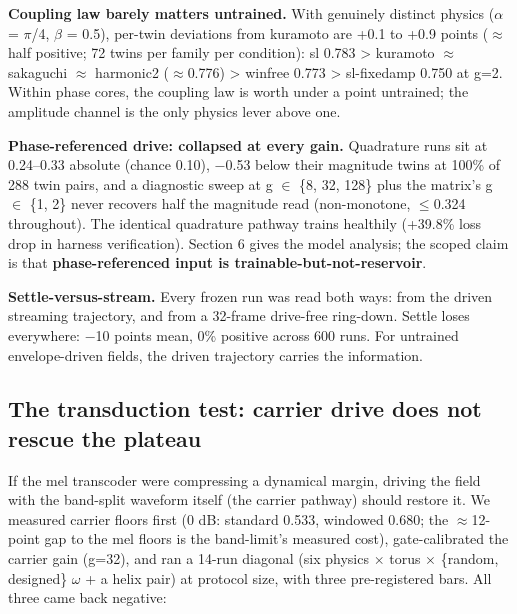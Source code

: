 \documentclass[10pt]{article}
\begin{document}
\textbf{Coupling law barely matters untrained.} With genuinely distinct
physics (\ensuremath{\alpha} = \ensuremath{\pi}/4, \ensuremath{\beta} =
0.5), per-twin deviations from kuramoto are +0.1 to +0.9 points
(\ensuremath{\approx} half positive; 72 twins per family per condition):
sl 0.783 \textgreater{} kuramoto \ensuremath{\approx} sakaguchi
\ensuremath{\approx} harmonic2 (\ensuremath{\approx}0.776)
\textgreater{} winfree 0.773 \textgreater{} sl-fixedamp 0.750 at g=2.
Within phase cores, the coupling law is worth under a point untrained;
the amplitude channel is the only physics lever above one.

\textbf{Phase-referenced drive: collapsed at every gain.} Quadrature
runs sit at 0.24--0.33 absolute (chance 0.10), \ensuremath{-}0.53 below
their magnitude twins at 100\% of 288 twin pairs, and a diagnostic sweep
at g \ensuremath{\in} \{8, 32, 128\} plus the matrix's g
\ensuremath{\in} \{1, 2\} never recovers half the magnitude read
(non-monotone, \ensuremath{\leq}0.324 throughout). The identical
quadrature pathway trains healthily (+39.8\% loss drop in harness
verification). Section 6 gives the model analysis; the scoped claim is
that \textbf{phase-referenced input is trainable-but-not-reservoir}.

\textbf{Settle-versus-stream.} Every frozen run was read both ways: from
the driven streaming trajectory, and from a 32-frame drive-free
ring-down. Settle loses everywhere: \ensuremath{-}10 points mean, 0\%
positive across 600 runs. For untrained envelope-driven fields, the
driven trajectory carries the information.

\subsection{The transduction test: carrier drive does not rescue the
plateau}\label{the-transduction-test-carrier-drive-does-not-rescue-the-plateau}

If the mel transcoder were compressing a dynamical margin, driving the
field with the band-split waveform itself (the carrier pathway) should
restore it. We measured carrier floors first (0 dB: standard 0.533,
windowed 0.680; the \ensuremath{\approx}12-point gap to the mel floors
is the band-limit's measured cost), gate-calibrated the carrier gain
(g=32), and ran a 14-run diagonal (six physics \ensuremath{\times} torus
\ensuremath{\times} \{random, designed\} \ensuremath{\omega} + a helix
pair) at protocol size, with three pre-registered bars. All three came
back negative:
\end{document}
